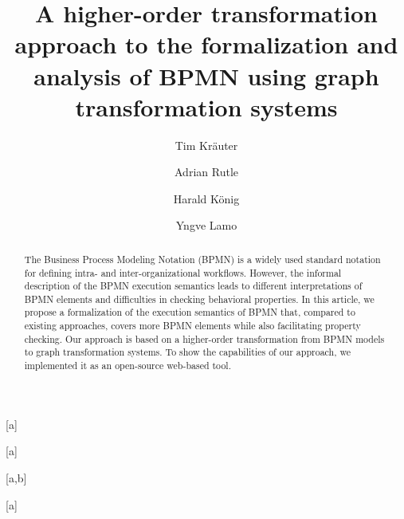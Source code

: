 \documentclass{lmcs} %
\begin{document}
\title[Formalization and analysis of BPMN using graph transformation systems]{A higher-order transformation approach to the formalization and analysis of BPMN using graph transformation systems\rsuper*}

\author[T.~Kr\"{a}uter]{Tim Kr\"{a}uter}[a]
\author[A.~Rutle]{Adrian Rutle}[a]
\author[H.~K\"{o}nig]{Harald K\"{o}nig}[a,b]
\author[Y.~Lamo]{Yngve Lamo}[a]

\address{Western Norway University of Applied Sciences, Bergen, Norway}

\address{University of Applied Sciences, FHDW, Hanover, Germany}

\begin{abstract}
  \noindent
The Business Process Modeling Notation (BPMN) is a widely used standard notation for defining intra- and inter-organizational workflows.
However, the informal description of the BPMN execution semantics leads to different interpretations of BPMN elements and difficulties in checking behavioral properties.
In this article, we propose a formalization of the execution semantics of BPMN that, compared to existing approaches, covers more BPMN elements while also facilitating property checking.
Our approach is based on a higher-order transformation from BPMN models to graph transformation systems.
To show the capabilities of our approach, we implemented it as an open-source web-based tool.
\end{abstract}

\maketitle
\end{document}
